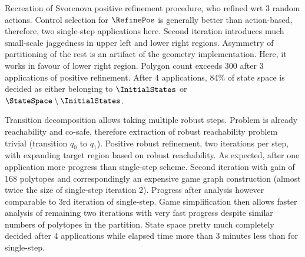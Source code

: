 
    Recreation of Svorenova positive refinement procedure, who refined wrt 3 random actions.
    Control selection for $\RefinePos$ is generally better than action-based, therefore, two single-step applications here.
    Second iteration introduces much small-scale jaggedness in upper left and lower right regions.
    Asymmetry of partitioning of the rest is an artifact of the geometry implementation.
    Here, it works in favour of lower right region.
    Polygon count exceeds 300 after 3 applications of positive refinement.
    After 4 applications, 84\% of state space is decided as either belonging to $\InitialStates$ or $\StateSpace \setminus \InitialStates$.

    Transition decomposition allows taking multiple robust steps.
    Problem is already reachability and co-safe, therefore extraction of robust reachability problem trivial (transition $q_0$ to $q_1$).
    Positive robust refinement, two iterations per step, with expanding target region based on robust reachability.
    As expected, after one application more progress than single-step scheme.
    Second iteration with gain of 168 polytopes and correspondingly an expensive game graph construction (almost twice the size of single-step iteration 2).
    Progress after analysis however comparable to 3rd iteration of single-step.
    Game simplification then allows faster analysis of remaining two iterations with very fast progress despite similar numbers of polytopes in the partition.
    State space pretty much completely decided after 4 applications while elapsed time more than 3 minutes less than for single-step.

